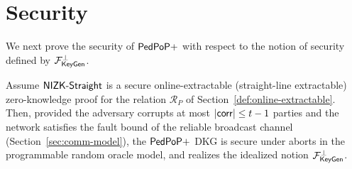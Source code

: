 \section{Security}

We next prove the security of $\mathsf{PedPoP+}$ with respect to the notion of security defined by $\mathcal{F}_{\mathsf{KeyGen}}^\bot$.

\begin{theorem}
\label{thm:keygen-pedpopplus}
Assume $\mathsf{NIZK}\hbox{-}{\mathsf{Straight}}$ is a secure online-extractable (straight-line extractable) zero-knowledge
proof for the relation $\mathcal{R}_P$ of Section~\ref{def:online-extractable}.
Then, provided the adversary corrupts at most $\lvert\mathsf{corr}\rvert \leq t-1$ parties
and the network satisfies the fault bound of the reliable broadcast channel
(Section~\ref{sec:comm-model}),
the $\mathsf{PedPoP+}$ DKG is secure under aborts in the programmable random oracle model,
and realizes the idealized notion $\mathcal{F}_{\mathsf{KeyGen}}^\bot$.
\end{theorem}

